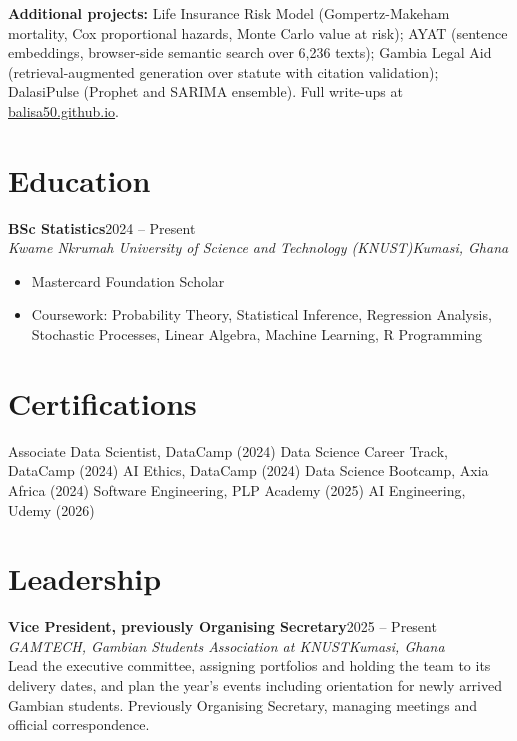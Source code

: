 \documentclass[a4paper,10pt]{article}
\newcommand{\entry}[4]{%
  \noindent\textbf{#1}\hfill{#2}\\[0.1em]
  \textit{#3}\hfill\textit{#4}\\[0.12em]
}
\begin{document}
\vspace{0.4em}
\textbf{Additional projects:} Life Insurance Risk Model (Gompertz-Makeham
mortality, Cox proportional hazards, Monte Carlo value at risk); AYAT
(sentence embeddings, browser-side semantic search over 6,236 texts); Gambia
Legal Aid (retrieval-augmented generation over statute with citation
validation); DalasiPulse (Prophet and SARIMA ensemble). Full write-ups at
\href{https://balisa50.github.io}{balisa50.github.io}.

\section{Education}

\entry{BSc Statistics}{2024 -- Present}{Kwame Nkrumah University of Science and Technology (KNUST)}{Kumasi, Ghana}
\begin{itemize}
  \item Mastercard Foundation Scholar
  \item Coursework: Probability Theory, Statistical Inference, Regression
    Analysis, Stochastic Processes, Linear Algebra, Machine Learning, R
    Programming
\end{itemize}

\section{Certifications}

Associate Data Scientist, DataCamp (2024) \textbullet{} Data Science Career
Track, DataCamp (2024) \textbullet{} AI Ethics, DataCamp (2024) \textbullet{}
Data Science Bootcamp, Axia Africa (2024) \textbullet{} Software Engineering,
PLP Academy (2025) \textbullet{} AI Engineering, Udemy (2026)

\section{Leadership}

\entry{Vice President, previously Organising Secretary}{2025 -- Present}{GAMTECH, Gambian Students Association at KNUST}{Kumasi, Ghana}
Lead the executive committee, assigning portfolios and holding the team to its
delivery dates, and plan the year's events including orientation for newly
arrived Gambian students. Previously Organising Secretary, managing meetings
and official correspondence.
\end{document}
